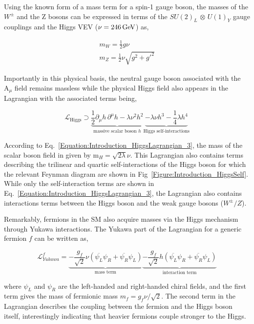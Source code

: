 Using the known form of a mass term for a spin-1 gauge boson, the masses of the $W^\pm$ and the Z bosons can be expressed in terms of the $SU(2)_{L}$ $\otimes$ $U(1)_{Y}$ gauge couplings and the Higgs VEV ($\nu = 246 \,\text{Ge\hspace{-.08em}V}$) as,

\begin{equation}
\begin{array}{c}
    m_W = \frac{1}{2}g\nu \\
    m_Z = \frac{1}{2}\nu\sqrt{g^2+g'^2}
\end{array}
\end{equation}

Importantly in this physical basis, the neutral gauge boson associated with the $\text{A}_\mu$ field remains massless while the physical Higgs field also appears in the Lagrangian with the associated terms being,

\begin{equation}
    \mathcal{L}_{\text{Higgs}} \supset \underbrace{\frac{1}{2} \partial_\mu h \, \partial^\mu h - \lambda \nu^2 h^2}_{\text{massive scalar boson } h}
    \underbrace{- \lambda \nu h^3 - \frac{1}{4} \lambda h^4}_{\text{Higgs self-interactions}}
\label{Equation:Introduction_HiggsLagrangian_3}
\end{equation}

According to Eq.~\ref{Equation:Introduction_HiggsLagrangian_3}, the mass of the scalar boson field in given by $\text{m}_H = \sqrt{2\lambda}\nu$. This Lagrangian also contains terms describing the trilinear and quartic self-interactions of the Higgs boson for which the relevant Feynman diagram are shown in Fig~\ref{Figure:Introduction_HiggsSelf}. While only the self-interaction terms are shown in Eq.~\ref{Equation:Introduction_HiggsLagrangian_3}, the Lagrangian also contains interactions terms between the Higgs boson and the weak gauge bosons ($W^\pm/Z$). 

Remarkably, fermions in the SM also acquire masses via the Higgs mechanism through Yukawa interactions. The Yukawa part of the Lagrangian for a generic fermion $f$ can be written as,


\begin{equation}
    \mathcal{L}_{Yukawa}^f = \underbrace{-\frac{g_f}{\sqrt{2}}\nu(\overline{\psi_L}\psi_R + \overline{\psi_R} \psi_L)}_{\text{mass term}} \underbrace{- \frac{g_f}{\sqrt{2}}h(\overline{\psi_L}\psi_R + \overline{\psi_R} \psi_L)}_{\text{interaction term}}
\end{equation}

where $\psi_L$ and $\psi_R$ are the left-handed and right-handed chiral fields, and the first term gives the mass of fermionic mass $m_f = g_f\nu / \sqrt{2}$. The second term in the Lagrangian describes the coupling between the fermion and the Higgs boson itself, interestingly indicating that heavier fermions couple stronger to the Higgs.

